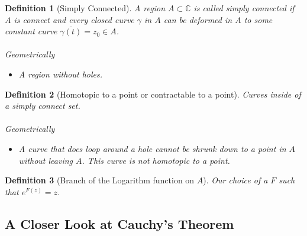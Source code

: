 \documentclass[a4paper]{article}
\newtheorem{definition}{Definition}
\newcommand{\C}{\mathbb{C}}
\begin{document}
\begin{definition}[Simply Connected]
  A region \(A \subset \C\) is called simply connected if \(A\) is connect and every closed curve \(\gamma\) in \(A\) can be deformed in \(A\) to some constant curve \(\bar{\gamma(t)} = z_0 \in A\). 
  
  \paragraph{}{Geometrically}
  \begin{itemize}
    \item A region without holes. 
  \end{itemize}

\end{definition}

\begin{definition}[Homotopic to a point or contractable to a point]
  Curves inside of a simply connect set. 

  \paragraph{}{Geometrically}
  \begin{itemize}
    \item A curve that does loop around a hole cannot be shrunk down to a point in \(A\) without leaving \(A\). This curve is not homotopic to a point. 
  \end{itemize}
\end{definition}







\begin{definition}[Branch of the Logarithm function on \(A\)]
  Our choice of a \(F\) such that \(e^{F(z)} = z\).
\end{definition}


\subsection{A Closer Look at Cauchy's Theorem}
\end{document}
